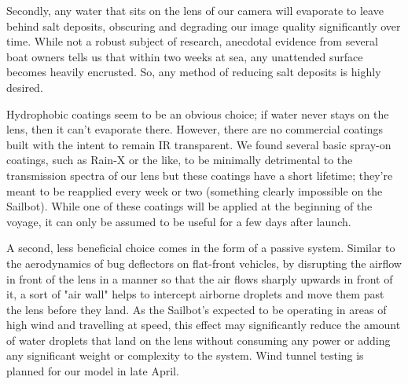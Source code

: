 Secondly, any water that sits on the lens of our camera will evaporate to leave behind salt deposits, obscuring and degrading our image quality significantly over time. While not a robust subject of research, anecdotal evidence from several boat owners tells us that within two weeks at sea, any unattended surface becomes heavily encrusted. So, any method of reducing salt deposits is highly desired. 

Hydrophobic coatings seem to be an obvious choice; if water never stays on the lens, then it can't evaporate there. However, there are no commercial coatings built with the intent to remain IR transparent. We found several basic spray-on coatings, such as Rain-X or the like, to be minimally detrimental to the transmission spectra of our lens but these coatings have a short lifetime; they're meant to be reapplied every week or two (something clearly impossible on the Sailbot). While one of these coatings will be applied at the beginning of the voyage, it can only be assumed to be useful for a few days after launch.

A second, less beneficial choice comes in the form of a passive system. Similar to the aerodynamics of bug deflectors on flat-front vehicles, \cite{bug-deflector} by disrupting the airflow in front of the lens in a manner so that the air flows sharply upwards in front of it, a sort of "air wall" helps to intercept airborne droplets and move them past the lens before they land. As the Sailbot's expected to be operating in areas of high wind and travelling at speed, this effect may significantly reduce the amount of water droplets that land on the lens without consuming any power or adding any significant weight or complexity to the system. Wind tunnel testing is planned for our model in late April.
